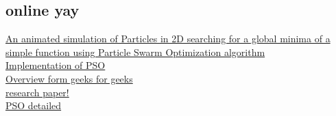 \documentclass[12pt]{report}
\begin{document}
\subsection*{online yay}
\href{https://in.mathworks.com/matlabcentral/fileexchange/11559-particle-swarm-optimization-simulation}{An animated simulation of Particles in 2D searching for a global minima of a simple function using Particle Swarm Optimization algorithm} \\
 \href{https://www.geeksforgeeks.org/implementation-of-particle-swarm-optimization/?ref=ml_lbp}{Implementation of PSO} \\
 \href{https://www.geeksforgeeks.org/particle-swarm-optimization-pso-an-overview/}{Overview form geeks for geeks} \\
  \href{https://link.springer.com/article/10.1007/s11831-021-09694-4#Sec3}{research paper!}
\\
\href{https://machinelearningmastery.com/a-gentle-introduction-to-particle-swarm-optimization/}{PSO detailed}






    
    
    
\end{document}
